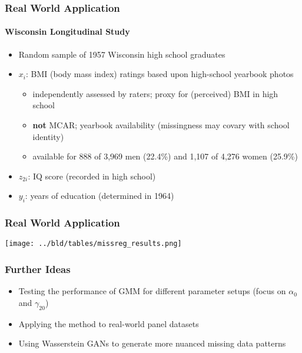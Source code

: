 \documentclass[aspectratio=1610]{beamer}
\begin{document}
\begin{frame}
	\frametitle{Real World Application}
	\framesubtitle{Wisconsin Longitudinal Study}
	\begin{itemize}
		\item<1-> Random sample of 1957 Wisconsin high school graduates

		\item<2-> $x_i$: BMI (body mass index) ratings based upon high-school yearbook photos
		\begin{itemize}
			\item<2-> independently assessed by raters; proxy for (perceived) BMI in high school
			\item<2-> \textbf{not} MCAR; yearbook availability (missingness may covary with school identity)
			\item<2-> available for 888 of 3,969 men (22.4\%) and 1,107 of 4,276 women (25.9\%)
		\end{itemize}

		\item<3-> $z_{2i}$: IQ score (recorded in high school)

		\item<4-> $y_i$: years of education (determined in 1964)
	\end{itemize}
\end{frame}

\begin{frame}
	\frametitle{Real World Application}
	\center
    \texttt{[image: ../bld/tables/missreg\_results.png]}
\end{frame}

\begin{frame}
	\frametitle{Further Ideas}
	\begin{itemize}
		\item Testing the performance of GMM for different parameter setups (focus on $\alpha_0$ and $\gamma_{20}$)
		\item Applying the method to real-world panel datasets
		\item Using Wasserstein GANs to generate more nuanced missing data patterns
	\end{itemize}
\end{frame}
\end{document}
